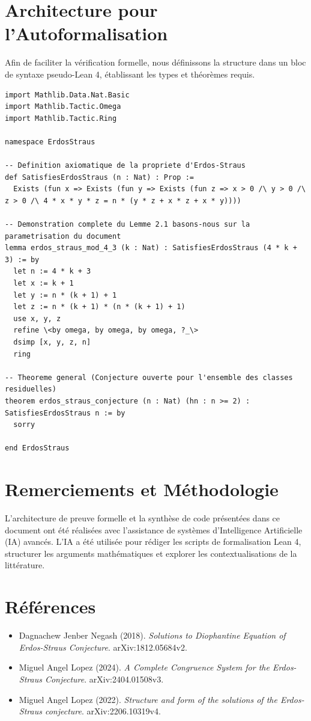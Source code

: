 \documentclass[12pt,a4paper]{article}
\begin{document}
\section{Architecture pour l'Autoformalisation}

Afin de faciliter la vérification formelle, nous définissons la structure dans un bloc de syntaxe pseudo-Lean 4, établissant les types et théorèmes requis.

\begin{verbatim}
import Mathlib.Data.Nat.Basic
import Mathlib.Tactic.Omega
import Mathlib.Tactic.Ring

namespace ErdosStraus

-- Definition axiomatique de la propriete d'Erdos-Straus
def SatisfiesErdosStraus (n : Nat) : Prop :=
  Exists (fun x => Exists (fun y => Exists (fun z => x > 0 /\ y > 0 /\ z > 0 /\ 4 * x * y * z = n * (y * z + x * z + x * y))))

-- Demonstration complete du Lemme 2.1 basons-nous sur la parametrisation du document
lemma erdos_straus_mod_4_3 (k : Nat) : SatisfiesErdosStraus (4 * k + 3) := by
  let n := 4 * k + 3
  let x := k + 1
  let y := n * (k + 1) + 1
  let z := n * (k + 1) * (n * (k + 1) + 1)
  use x, y, z
  refine \<by omega, by omega, by omega, ?_\>
  dsimp [x, y, z, n]
  ring

-- Theoreme general (Conjecture ouverte pour l'ensemble des classes residuelles)
theorem erdos_straus_conjecture (n : Nat) (hn : n >= 2) : SatisfiesErdosStraus n := by
  sorry

end ErdosStraus
\end{verbatim}


\section*{Remerciements et M\'ethodologie}
L'architecture de preuve formelle et la synth\`ese de code pr\'esent\'ees dans ce document ont \'et\'e r\'ealis\'ees avec l'assistance de syst\`emes d'Intelligence Artificielle (IA) avanc\'es. L'IA a \'et\'e utilis\'ee pour r\'ediger les scripts de formalisation Lean 4, structurer les arguments math\'ematiques et explorer les contextualisations de la litt\'erature.

\section*{R\'ef\'erences}
\begin{itemize}
    \item Dagnachew Jenber Negash (2018). \textit{Solutions to Diophantine Equation of Erdos-Straus Conjecture}. arXiv:1812.05684v2.
    \item Miguel Angel Lopez (2024). \textit{A Complete Congruence System for the Erdos-Straus Conjecture}. arXiv:2404.01508v3.
    \item Miguel Angel Lopez (2022). \textit{Structure and form of the solutions of the Erdos-Straus conjecture}. arXiv:2206.10319v4.
\end{itemize}

\
\end{document}
